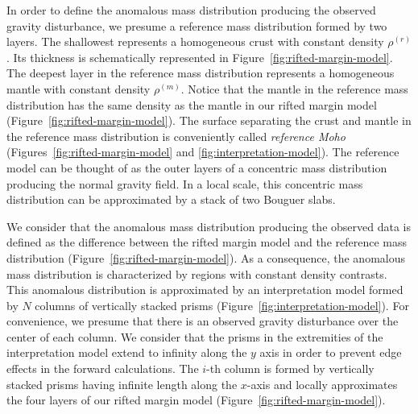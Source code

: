 \documentclass[manuscript]{geophysics}
\begin{document}
In order to define the anomalous mass distribution producing the observed gravity
disturbance, we presume a reference mass distribution formed by two 
layers. The shallowest represents a homogeneous crust with constant
density $\rho^{(r)}$. Its thickness is schematically represented in
Figure~\ref{fig:rifted-margin-model}.
The deepest layer in the reference mass distribution represents a homogeneous mantle
with constant density $\rho^{(m)}$. Notice that the mantle in the reference mass 
distribution has the same density as the mantle in our rifted margin model
(Figure~\ref{fig:rifted-margin-model}).
The surface separating the crust and mantle in the reference mass distribution 
is conveniently called \textit{reference Moho} (Figures~\ref{fig:rifted-margin-model} 
and \ref{fig:interpretation-model}).
The reference model can be thought of as the outer layers of a concentric
mass distribution producing the normal gravity field.
In a local scale, this concentric mass distribution can be approximated by a 
stack of two Bouguer slabs.

We consider that the anomalous mass distribution producing the observed data
is defined as the difference between the rifted margin model 
and the reference mass distribution (Figure~\ref{fig:rifted-margin-model}).
As a consequence, the anomalous mass distribution is characterized by regions
with constant density contrasts.
This anomalous distribution is approximated by an interpretation model 
formed by $N$ columns of vertically stacked prisms 
(Figure~\ref{fig:interpretation-model}).
For convenience, we presume that there is an observed gravity disturbance over the
center of each column.
We consider that the prisms in the extremities of the interpretation model extend to
infinity along the $y$ axis in order to prevent edge effects in the forward 
calculations. 
The $i$-th column is formed by vertically stacked prisms having infinite length along 
the $x$-axis and locally approximates the four layers of our rifted margin model
(Figure~\ref{fig:rifted-margin-model}).
\end{document}
